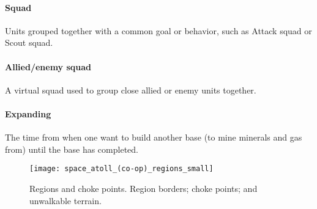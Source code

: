 \paragraph{Squad} Units grouped together with a common goal or behavior, such as Attack squad or Scout squad.
\paragraph{Allied/enemy squad} A virtual squad used to group close allied or enemy units together.
\paragraph{Expanding} The time from when one want to build another base (to mine minerals and gas from) until the base has completed.

\begin{figure}[htb]
	\centering
	\texttt{[image: space\_atoll\_(co-op)\_regions\_small]}
	\caption[Regions and choke points]{
		Regions and choke points.
		\usebox{\LegendLineLightGreen} Region borders;
		\usebox{\LegendLineRed} choke points; and
		\usebox{\LegendBoxYellow} unwalkable terrain.}
	\label{fig:region_and_choke_points}
\end{figure}
